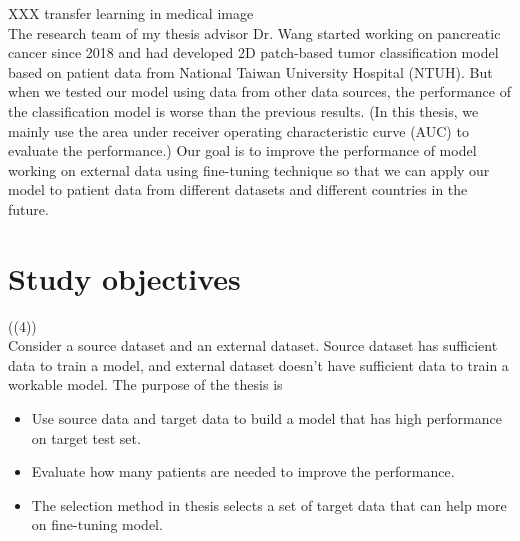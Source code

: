 XXX  transfer learning  in medical image \\
The research team of my thesis advisor Dr. Wang started working on pancreatic cancer since 2018 and had developed 2D patch-based tumor classification model based on patient data from National Taiwan University Hospital (NTUH). But when we tested our model using data from other data sources, the performance of the classification model is worse than the previous results. (In this thesis, we mainly use the area under receiver operating characteristic curve (AUC) to evaluate the performance.) Our goal is to improve the performance of model working on external data using fine-tuning technique so that we can apply our model to patient data from different datasets and different countries in the future.

\section{Study objectives}
((4))\\
Consider a source dataset and an external dataset. Source dataset has sufficient data to train a model, and external dataset doesn't have sufficient data to train a workable model. The purpose of the thesis is
\begin{itemize}
    \item Use source data and target data to build a model that has high performance on target test set.
    \item Evaluate how many patients are needed to improve the performance.
    \item The selection method in thesis \cite{zhou2017fine} selects a set of target data that can help more on fine-tuning model. 
\end{itemize}
